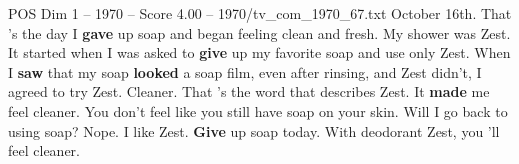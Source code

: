\begin{textsample}{POS Dim 1 – 1970 – Score 4.00 – 1970/tv\_com\_1970\_67.txt}  \label{ex:f1_pos_038}
October 16th.
That 's the day I \textbf{gave} up soap and began feeling clean and fresh.
My shower was Zest.
It started when I was asked to \textbf{give} up my favorite soap and use only Zest.
When I \textbf{saw} that my soap \textbf{looked} a soap film, even after rinsing, and Zest didn't, I agreed to try Zest.
Cleaner.
That 's the word that describes Zest.
It \textbf{made} me feel cleaner.
You don't feel like you still have soap on your skin.
Will I go back to using soap?
Nope.
I like Zest. \textbf{Give} up soap today.
With deodorant Zest, you 'll feel cleaner.

\end{textsample}
